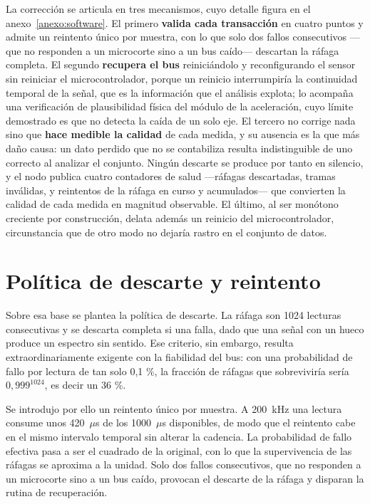 La corrección se articula en tres mecanismos, cuyo detalle figura en el
anexo~\ref{anexo:software}. El primero \textbf{valida cada transacción} en cuatro puntos y admite
un reintento único por muestra, con lo que solo dos fallos consecutivos —que no responden a un
microcorte sino a un bus caído— descartan la ráfaga completa. El segundo \textbf{recupera el bus}
reiniciándolo y reconfigurando el sensor sin reiniciar el microcontrolador, porque un reinicio
interrumpiría la continuidad temporal de la señal, que es la información que el análisis explota;
lo acompaña una verificación de plausibilidad física del módulo de la aceleración, cuyo límite
demostrado es que no detecta la caída de un solo eje. El tercero no corrige nada sino que
\textbf{hace medible la calidad} de cada medida, y su ausencia es la que más daño causa: un dato
perdido que no se contabiliza resulta indistinguible de uno correcto al analizar el conjunto.
Ningún descarte se produce por tanto en silencio, y el nodo publica cuatro contadores de salud
—ráfagas descartadas, tramas inválidas, y reintentos de la ráfaga en curso y acumulados— que
convierten la calidad de cada medida en magnitud observable. El último, al ser monótono creciente
por construcción, delata además un reinicio del microcontrolador, circunstancia que de otro modo
no dejaría rastro en el conjunto de datos.

\section{Política de descarte y reintento}

Sobre esa base se plantea la política de descarte. La ráfaga son 1024 lecturas
consecutivas y se descarta completa si una falla, dado que una señal con un hueco produce un
espectro sin sentido. Ese criterio, sin embargo, resulta extraordinariamente exigente con la
fiabilidad del bus: con una probabilidad de fallo por lectura de tan solo 0,1 \%, la
fracción de ráfagas que sobreviviría sería $0{,}999^{1024}$, es decir un 36 \%.

Se introdujo por ello un reintento único por muestra. A \mbox{200 kHz} una lectura consume
unos \mbox{420 $\mu$s} de los \mbox{1000 $\mu$s} disponibles, de modo que el reintento cabe
en el mismo intervalo temporal sin alterar la cadencia. La probabilidad de fallo efectiva
pasa a ser el cuadrado de la original, con lo que la supervivencia de las ráfagas se
aproxima a la unidad. Solo dos fallos consecutivos, que no responden a un microcorte sino a
un bus caído, provocan el descarte de la ráfaga y disparan la rutina de recuperación.

